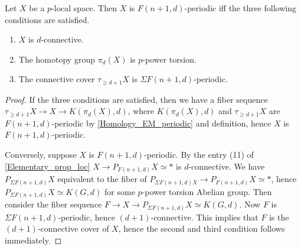 	\begin{lemma}\label{Tel_loc_acyc_cond}
		Let $X$ be a $p$-local space. Then $X$ is $F(n+1,d)$-periodic iff the three following conditions are satisfied. 
		\begin{enumerate}
			\item $X$ is $d$-connective. 
			\item The homotopy group $\pi_d(X)$ is $p$-power torsion. 
			\item The connective cover $\tau_{\geq d+1}X$ is $\Sigma F(n+1,d)$-periodic. 
		\end{enumerate}
	\end{lemma}
	\begin{proof}
		If the three conditions are satisfied, then we have a fiber sequence $\tau_{\geq d+1}X\to X\to K(\pi_d(X),d)$, where $K(\pi_d(X),d)$ and $\tau_{\geq d+1}X$ are $F(n+1,d)$-periodic by \cref{Homology_EM_periodic} and definition, hence $X$ is $F(n+1,d)$-periodic. 

		Conversely, suppose $X$ is $F(n+1,d)$-periodic. By the entry (11) of \cref{Elementary_prop_loc} $X\to P_{F(n+1,d)}X\simeq*$ is $d$-connective. We have $P_{\Sigma F(n+1,d)}X$ equivalent to the fiber of $P_{\Sigma F(n+1,d)X}\to P_{F(n+1,d)}X\simeq*$, hence $P_{\Sigma F(n+1,d)}X\simeq K(G,d)$ for some $p$-power torsion Abelian group. Then consider the fiber sequence $F\to X\to P_{\Sigma F(n+1,d)}X\simeq K(G,d)$. Now $F$ is $\Sigma F(n+1,d)$-periodic, hence $(d+1)$-connective. This implies that $F$ is the $(d+1)$-connective cover of $X$, hence the second and third condition follows immediately. 
	\end{proof}

